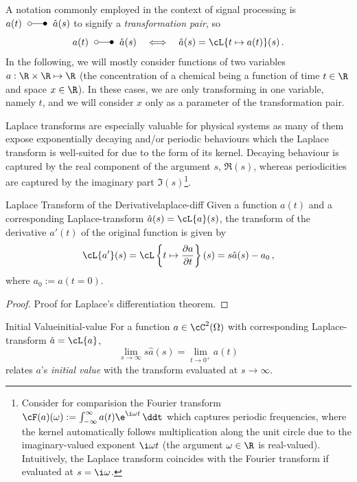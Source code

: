 \documentclass{prettytex/ox/mmsc-special-topic}
\begin{document}
  A notation commonly employed in the context of signal processing is $a(t) \;\laplace\; \hat{a}(s)$ to signify a \textit{transformation pair}, so
  $$a(t) \;\laplace\; \hat{a}(s) \quad\Longleftrightarrow\quad \hat{a}(s) = \cL\{t \mapsto a(t)\}(s)\,.$$
  In the following, we will mostly consider functions of two variables $a: \R \times \R \mapsto \R$ (the concentration of a chemical being a function of time $t \in \R$ and space $x \in \R$).
  In these cases, we are only transforming in one variable, namely $t$, and we will consider $x$ only as a parameter of the transformation pair.

  Laplace transforms are especially valuable for physical systems as many of them expose exponentially decaying and/or periodic behaviours which the Laplace transform is well-suited for due to the form of its kernel.
  Decaying behaviour is captured by the real component of the argument $s$, $\Re(s)$, whereas periodicities are captured by the imaginary part $\Im(s)$\footnote{Consider for comparision the Fourier transform $\cF(a)(\omega) := \int_{-\infty}^{\infty} a(t) \e^{\i \omega t} \,\ddt$ which captures periodic frequencies, where the kernel automatically follows multiplication along the unit circle due to the imaginary-valued exponent $\i\omega t$ (the argument $\omega \in \R$ is real-valued). Intuitively, the Laplace transform coincides with the Fourier transform if evaluated at $s = \i \omega$.}.

  \begin{theorem}{Laplace Transform of the Derivative}{laplace-diff}
    Given a function $a(t)$ and a corresponding Laplace-transform $\hat{a}(s) = \cL\{a\}(s)$, the transform of the derivative $a'(t)$ of the original function is given by
    $$\cL\{a'\}(s) = \cL\left\{t \mapsto \frac{\partial a}{\partial t}\right\}(s) = s\hat{a}(s) - a_0\,,$$
    where $a_0 := a(t=0)$.
  \end{theorem}

  \begin{proof}
    Proof for Laplace's differentiation theorem.
  \end{proof}

  \begin{theorem}{Initial Value}{initial-value}
    For a function $a \in \cC^2(\Omega)$ with corresponding Laplace-transform $\hat{a} = \cL\{a\}$,
    $$\lim_{s \rightarrow \infty} s \hat{a}(s) = \lim_{t \rightarrow 0^+} a(t)$$
    relates $a$'s \textit{initial value} with the transform evaluated at $s \rightarrow \infty$.
  \end{theorem}
\end{document}
